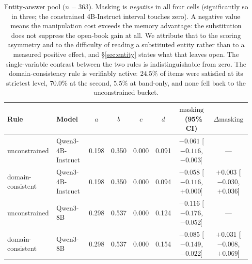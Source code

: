 \documentclass[11pt]{article}
\newcommand{\mask}{\ensuremath{\mathrm{masking}}}
\begin{document}
\begin{table}[t]\centering\small
\caption{Entity-answer pool ($n{=}363$). Masking is \emph{negative} in all four cells
(significantly so in three; the constrained 4B-Instruct interval touches zero). A negative
value means the manipulation cost exceeds the memory advantage: the substitution does not
suppress the open-book gain at all. We attribute that to the scoring asymmetry and to the
difficulty of reading a substituted entity rather than to a measured positive effect, and
\S\ref{sec:entity} states what that leaves open. The single-variable contrast between the
two rules is indistinguishable from zero. The domain-consistency rule is verifiably active:
$24.5\%$ of items were satisfied at its strictest level, $70.0\%$ at the second, $5.5\%$ at
band-only, and none fell back to the unconstrained bucket.}
\label{tab:entity}
\begin{tabular}{llcccccc}
\toprule
Rule & Model & $a$ & $b$ & $c$ & $d$ & \mask\ (95\% CI) & $\Delta\mask$ \\
\midrule
unconstrained      & Qwen3-4B-Instruct & 0.198 & 0.350 & 0.000 & 0.091 & $-0.061$ [$-0.116$, $-0.003$] & --- \\
domain-consistent  & Qwen3-4B-Instruct & 0.198 & 0.350 & 0.000 & 0.094 & $-0.058$ [$-0.116$, $+0.000$] & $+0.003$ [$-0.030$, $+0.036$] \\
unconstrained      & Qwen3-8B          & 0.298 & 0.537 & 0.000 & 0.124 & $-0.116$ [$-0.176$, $-0.052$] & --- \\
domain-consistent  & Qwen3-8B          & 0.298 & 0.537 & 0.000 & 0.154 & $-0.085$ [$-0.149$, $-0.022$] & $+0.031$ [$-0.008$, $+0.069$] \\
\bottomrule
\end{tabular}
\end{table}
\end{document}
